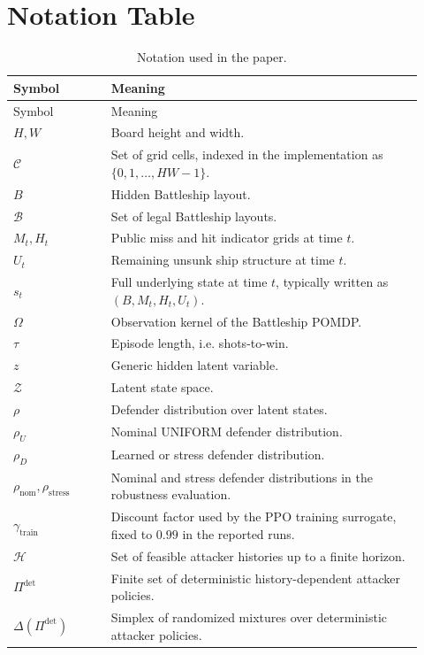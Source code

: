 \documentclass[11pt]{article}
\newcommand{\Zset}{\mathcal{Z}}
\newcommand{\Bset}{\mathcal{B}}
\newcommand{\Hset}{\mathcal{H}}
\newcommand{\tauT}{\tau}
\newcommand{\rhoNom}{\rho_{\mathrm{nom}}}
\newcommand{\rhoStress}{\rho_{\mathrm{stress}}}
\newcommand{\gammaTrain}{\gamma_{\mathrm{train}}}
\begin{document}
\appendix

\section{Notation Table}

\begin{longtable}{p{0.22\linewidth}p{0.70\linewidth}}
\caption{Notation used in the paper.} \\
\toprule
Symbol & Meaning \\
\midrule
\endfirsthead
\toprule
Symbol & Meaning \\
\midrule
\endhead
$H,W$ & Board height and width. \\
$\mathcal{C}$ & Set of grid cells, indexed in the implementation as $\{0,1,\dots,HW-1\}$. \\
$B$ & Hidden Battleship layout. \\
$\Bset$ & Set of legal Battleship layouts. \\
$M_t,H_t$ & Public miss and hit indicator grids at time $t$. \\
$U_t$ & Remaining unsunk ship structure at time $t$. \\
$s_t$ & Full underlying state at time $t$, typically written as $(B,M_t,H_t,U_t)$. \\
$\Omega$ & Observation kernel of the Battleship POMDP. \\
$\tauT$ & Episode length, i.e. shots-to-win. \\
$z$ & Generic hidden latent variable. \\
$\Zset$ & Latent state space. \\
$\rho$ & Defender distribution over latent states. \\
$\rho_U$ & Nominal UNIFORM defender distribution. \\
$\rho_D$ & Learned or stress defender distribution. \\
$\rhoNom,\rhoStress$ & Nominal and stress defender distributions in the robustness evaluation. \\
$\gammaTrain$ & Discount factor used by the PPO training surrogate, fixed to $0.99$ in the reported runs. \\
$\Hset$ & Set of feasible attacker histories up to a finite horizon. \\
$\Pi^{\det}$ & Finite set of deterministic history-dependent attacker policies. \\
$\Delta(\Pi^{\det})$ & Simplex of randomized mixtures over deterministic attacker policies. \\

\end{longtable}
\end{document}
